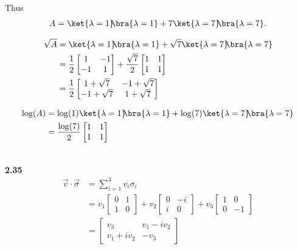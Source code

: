 \documentclass[10pt]{book}
\newcommand{\kb}[1]{\ket{#1}\hspace{-1mm} \bra{#1}} %
\newcommand{\Textbf}[1]{\hspace{3mm}\\ \textbf{#1}\\}
\begin{document}
	\vspace{5mm}
	Thus
	\begin{equation}
\begin{aligned}
		A = \kb{\lambda = 1} + 7 \kb{\lambda = 7}.
	\end{aligned}
\end{equation}
	
	\begin{equation}
\begin{aligned}
		\sqrt{A} &= \kb{\lambda = 1} + \sqrt{7} \kb{\lambda = 7}\\
		&= \frac{1}{2} \begin{bmatrix}
			1 & -1 \\
			-1 & 1
		\end{bmatrix}
		+
		\frac{\sqrt{7}}{2} \begin{bmatrix}
			1 & 1 \\
			1 & 1
		\end{bmatrix}\\
		&=
		\frac{1}{2}
		\begin{bmatrix}
			1+\sqrt{7} & -1+\sqrt{7} \\
			-1 + \sqrt{7} & 1+\sqrt{7}
		\end{bmatrix}
	\end{aligned}
\end{equation}
	
	\begin{equation}
\begin{aligned}
		\log (A) &=  \log (1) \kb{\lambda = 1} + \log (7) \kb{\lambda = 7}\\
		&= \frac{\log (7)}{2} \begin{bmatrix}
			1 & 1 \\
			1 & 1
		\end{bmatrix}
	\end{aligned}
\end{equation}
	
	
	
	\Textbf{2.35}
	\begin{equation}
\begin{aligned}
		\vec{v} \cdot \vec{\sigma} &= \sum_{i=1}^3 v_i \sigma_i\\
		&= v_1 \begin{bmatrix}
			0 & 1 \\
			1 & 0
		\end{bmatrix}
		+ v_2 \begin{bmatrix}
			0 & -i \\
			i & 0
		\end{bmatrix}
		+ v_3 \begin{bmatrix}
			1 & 0 \\
			0 & -1
		\end{bmatrix} \\
		&= \begin{bmatrix}
			v_3 & v_1 - i v_2 \\
			v_1 + iv_2 & -v_3
		\end{bmatrix}
	\end{aligned}
\end{equation}
	
\end{document}
